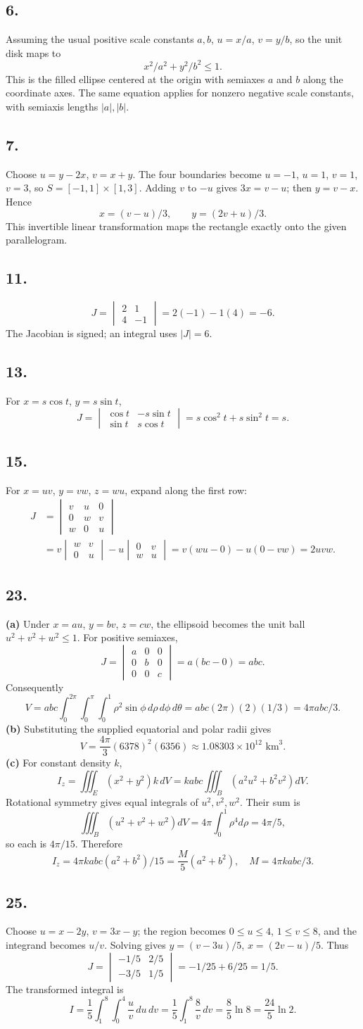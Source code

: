 \documentclass[11pt]{article}
\newcommand{\ex}[1]{\subsection*{#1.}}
\newcommand{\ans}[1]{\boxed{#1}}
\begin{document}
\ex{6}
Assuming the usual positive scale constants $a,b$, $u=x/a$, $v=y/b$, so the unit disk maps to
\[\ans{x^2/a^2+y^2/b^2\le1}.\]
This is the filled ellipse centered at the origin with semiaxes $a$ and $b$ along the coordinate axes. The same equation applies for nonzero negative scale constants, with semiaxis lengths $|a|,|b|$.
\ex{7}
Choose $u=y-2x$, $v=x+y$. The four boundaries become $u=-1$, $u=1$, $v=1$, $v=3$, so $S=[-1,1]\times[1,3]$. Adding $v$ to $-u$ gives $3x=v-u$; then $y=v-x$. Hence
\[\ans{x=(v-u)/3,\qquad y=(2v+u)/3}.\]
This invertible linear transformation maps the rectangle exactly onto the given parallelogram.
\ex{11}
\[J=\begin{vmatrix}2&1\\4&-1\end{vmatrix}=2(-1)-1(4)=\ans{-6}.\]
The Jacobian is signed; an integral uses $|J|=6$.
\ex{13}
For $x=s\cos t$, $y=s\sin t$,
\[J=\begin{vmatrix}\cos t&-s\sin t\\\sin t&s\cos t\end{vmatrix}
=s\cos^2t+s\sin^2t=\ans{s}.\]
\ex{15}
For $x=uv$, $y=vw$, $z=wu$, expand along the first row:
\begin{align*}
J&=\begin{vmatrix}v&u&0\\0&w&v\\w&0&u\end{vmatrix}\\
&=v\begin{vmatrix}w&v\\0&u\end{vmatrix}-u\begin{vmatrix}0&v\\w&u\end{vmatrix}
=v(wu-0)-u(0-vw)=\ans{2uvw}.
\end{align*}
\ex{23}
\textbf{(a)} Under $x=au$, $y=bv$, $z=cw$, the ellipsoid becomes the unit ball $u^2+v^2+w^2\le1$. For positive semiaxes,
\[J=\begin{vmatrix}a&0&0\\0&b&0\\0&0&c\end{vmatrix}=a(bc-0)=abc.\]
Consequently
\[V=abc\int_0^{2\pi}\int_0^\pi\int_0^1\rho^2\sin\phi\,d\rho\,d\phi\,d\theta
=abc(2\pi)(2)(1/3)=\ans{4\pi abc/3}.\]
\textbf{(b)} Substituting the supplied equatorial and polar radii gives
\[V=\frac{4\pi}{3}(6378)^2(6356)\approx\ans{1.08303\times10^{12}\text{ km}^3}.\]
\textbf{(c)} For constant density $k$,
\[I_z=\iiint_E(x^2+y^2)k\,dV=kabc\iiint_B(a^2u^2+b^2v^2)dV.\]
Rotational symmetry gives equal integrals of $u^2,v^2,w^2$. Their sum is
\[\iiint_B(u^2+v^2+w^2)dV=4\pi\int_0^1\rho^4d\rho=4\pi/5,\]
so each is $4\pi/15$. Therefore
\[\ans{I_z=4\pi kabc(a^2+b^2)/15=\frac{M}{5}(a^2+b^2)},\quad M=4\pi kabc/3.\]
\ex{25}
Choose $u=x-2y$, $v=3x-y$; the region becomes $0\le u\le4$, $1\le v\le8$, and the integrand becomes $u/v$. Solving gives $y=(v-3u)/5$, $x=(2v-u)/5$. Thus
\[J=\begin{vmatrix}-1/5&2/5\\-3/5&1/5\end{vmatrix}=-1/25+6/25=1/5.\]
The transformed integral is
\[I=\frac15\int_1^8\int_0^4\frac uv\,du\,dv
=\frac15\int_1^8\frac8v\,dv=\ans{\frac85\ln8=\frac{24}{5}\ln2}.\]
\end{document}
